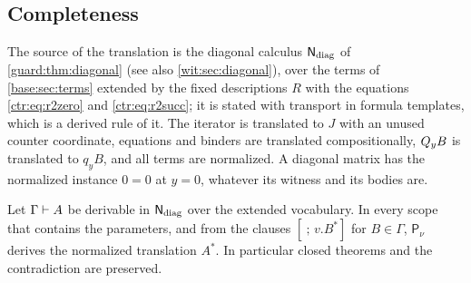 \subsection{Completeness}

The source of the translation is the diagonal calculus $\mathsf{N}_{\mathrm{diag}}$ of
\cref{guard:thm:diagonal} (see also \cref{wit:sec:diagonal}), over the terms of \cref{base:sec:terms} extended by
the fixed descriptions $R$ with the equations \eqref{ctr:eq:r2zero} and \eqref{ctr:eq:r2succ}; it is stated
with transport in formula templates, which is a derived rule of it.  The
iterator is translated to $J$ with an unused counter coordinate, equations
and binders are translated compositionally, $Q_{y}B$ is translated to
$q_yB$, and all terms are normalized.  A diagonal matrix has the normalized
instance $0=0$ at $y=0$, whatever its witness and its bodies are.

\begin{theorem}
\label{wit:thm:recursor}
Let $\Gamma\vdash A$ be derivable in $\mathsf{N}_{\mathrm{diag}}$ over the extended
vocabulary.  In every scope that contains the parameters, and from the
clauses $[\ ;\,v.B^{*}]$ for $B\in\Gamma$, $\mathsf{P}_{\nu}$ derives the
normalized translation $A^{*}$.  In particular closed theorems and the
contradiction are preserved.
\end{theorem}

